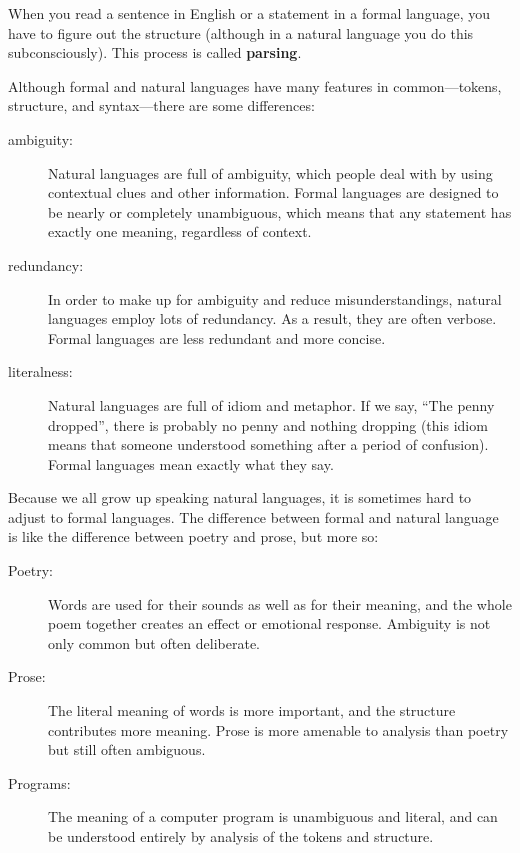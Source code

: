 When you read a sentence in English or a statement in a formal language, you
have to figure out the structure (although in a natural language you do this
subconsciously). This process is called {\bf parsing}. 

Although formal and natural languages have many features in common---tokens,
structure, and syntax---there are some differences:

\begin{description}

\item[ambiguity:] Natural languages are full of ambiguity, which
people deal with by using contextual clues and other information.
Formal languages are designed to be nearly or completely unambiguous,
which means that any statement has exactly one meaning,
regardless of context.

\item[redundancy:] In order to make up for ambiguity and reduce
misunderstandings, natural languages employ lots of redundancy. As a result,
they are often verbose. Formal languages are less redundant and more concise.

\item[literalness:] Natural languages are full of idiom and metaphor. If we
say, ``The penny dropped'', there is probably no penny and nothing dropping
(this idiom means that someone understood something after a period of
confusion). Formal languages mean exactly what they say.

\end{description}

Because we all grow up speaking natural languages, it is sometimes hard to
adjust to formal languages. The difference between formal and natural language
is like the difference between poetry and prose, but more so: 

\begin{description}

\item[Poetry:] Words are used for their sounds as well as for their meaning,
and the whole poem together creates an effect or emotional response. Ambiguity
is not only common but often deliberate.

\item[Prose:] The literal meaning of words is more important, and the
structure contributes more meaning. Prose is more amenable to analysis than
poetry but still often ambiguous.

\item[Programs:] The meaning of a computer program is unambiguous and literal,
and can be understood entirely by analysis of the tokens and structure.

\end{description}

